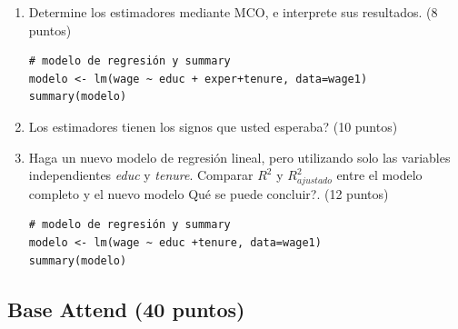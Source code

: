 \documentclass[letterpaper,11pt]{article}
\begin{document}
\begin{enumerate}


\begin{lstlisting}
# Wooldridge
library(wooldridge)
data("wage1")
wage1 <- na.omit(wage1)
\end{lstlisting}
\item Determine los estimadores mediante MCO, e interprete sus resultados. (8 puntos)
\begin{lstlisting}
# modelo de regresión y summary
modelo <- lm(wage ~ educ + exper+tenure, data=wage1)
summary(modelo)
\end{lstlisting}


\item \textquestiondown Los estimadores tienen los signos que usted esperaba? (10 puntos)


\item Haga un nuevo modelo de regresión lineal, pero utilizando solo las variables independientes \textit{educ} y \textit{tenure}. Comparar $R^2$ y $R^2_{ajustado}$ entre el modelo completo y el nuevo modelo \textquestiondown Qué se puede concluir?. (12 puntos)
\begin{lstlisting}
# modelo de regresión y summary
modelo <- lm(wage ~ educ +tenure, data=wage1)
summary(modelo)
\end{lstlisting}



\end{enumerate}

\subsection{Base Attend (40 puntos)}
\end{document}
